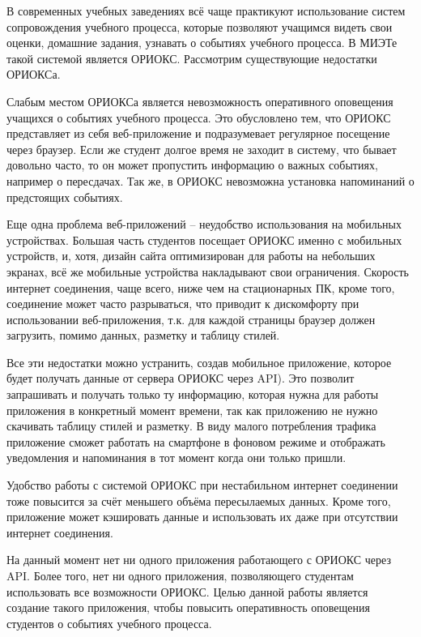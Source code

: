 \Introduction
{}
В современных учебных заведениях всё чаще практикуют использование систем  сопровождения учебного процесса, которые позволяют учащимся видеть свои оценки, домашние задания, узнавать о событиях учебного процесса. В МИЭТе такой системой является ОРИОКС.
Рассмотрим существующие недостатки ОРИОКСа.

Слабым местом ОРИОКСа является невозможность оперативного оповещения учащихся о событиях учебного процесса. Это обусловлено тем, что ОРИОКС представляет из себя веб-приложение
и подразумевает регулярное посещение через браузер. Если же студент долгое время не заходит в систему, что бывает довольно часто, то он может пропустить информацию о важных событиях, например о пересдачах. Так же, в ОРИОКС невозможна установка напоминаний о предстоящих событиях.

Еще одна проблема веб-приложений – неудобство использования на мобильных 
устройствах. Большая часть студентов посещает ОРИОКС именно с мобильных 
устройств, и, хотя, дизайн сайта оптимизирован для работы на небольших 
экранах, всё же мобильные устройства накладывают свои ограничения. 
Скорость интернет соединения, чаще всего, ниже чем на стационарных ПК,
кроме того, соединение может часто разрываться, что приводит к дискомфорту 
при использовании веб-приложения, т.к. для каждой страницы браузер должен 
загрузить, помимо данных, разметку и таблицу стилей.

Все эти недостатки можно устранить, создав мобильное приложение,
которое 
будет получать данные от сервера ОРИОКС через API).
Это позволит запрашивать и получать только ту информацию, которая нужна 
для работы приложения в конкретный момент времени, так как приложению не 
нужно скачивать таблицу стилей и разметку. В виду малого потребления 
трафика приложение сможет работать на смартфоне в фоновом режиме и 
отображать уведомления и напоминания в тот момент когда они только пришли. 

Удобство работы с системой ОРИОКС при нестабильном интернет соединении 
тоже повысится за счёт меньшего объёма пересылаемых данных. Кроме того, 
приложение может кэшировать
данные и использовать их даже при отсутствии интернет соединения.

На данный момент нет ни одного приложения работающего с ОРИОКС через API. 
Более того, нет ни одного приложения, позволяющего студентам использовать 
все возможности ОРИОКС. Целью данной работы является создание такого 
приложения, чтобы повысить оперативность оповещения студентов о событиях 
учебного процесса.
